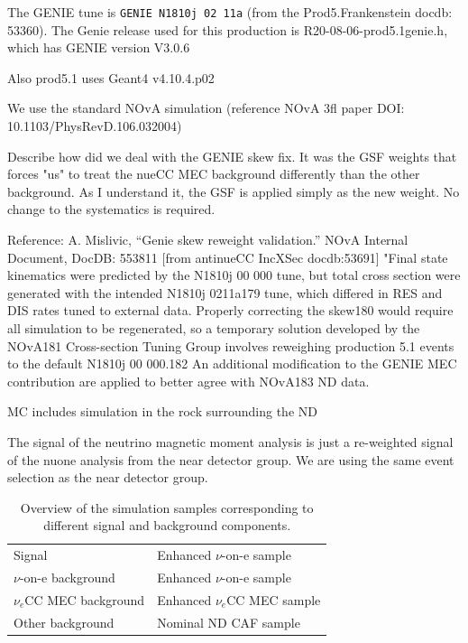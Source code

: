 The \textsf{GENIE} tune is \texttt{GENIE N1810j 02 11a} (from the Prod5.Frankenstein docdb: 53360).
The Genie release used for this production is R20-08-06-prod5.1genie.h, which has GENIE version V3.0.6 \cite{GENIE}

Also prod5.1 uses Geant4 v4.10.4.p02 \cite{Geant4}

We use the standard NOvA simulation (reference NOvA 3fl paper DOI: 10.1103/PhysRevD.106.032004)

Describe how did we deal with the GENIE skew fix. It was the GSF weights that forces "us" to treat the nueCC MEC background differently than the other background. As I understand it, the GSF is applied simply as the new weight. No change to the systematics is required.

Reference: A. Mislivic, “Genie skew reweight validation.” NOvA Internal Document, DocDB: 553811
[from antinueCC IncXSec docdb:53691]
"Final state kinematics were predicted by the N1810j 00 000 tune, but total cross section were generated with the intended N1810j 0211a179 tune, which differed in RES and DIS rates tuned to external data. Properly correcting the skew180 would require all simulation to be regenerated, so a temporary solution developed by the NOvA181 Cross-section Tuning Group involves reweighing production 5.1 events to the default N1810j 00 000.182 An additional modification to the GENIE MEC contribution are applied to better agree with NOvA183 ND data.

MC includes simulation in the rock surrounding the ND


The signal of the neutrino magnetic moment analysis is just a re-weighted signal of the \gls{nuone} analysis from the near detector group. We are using the same event selection as the near detector group.


\begin{table}[!ht]
\centering
\caption{Overview of the simulation samples corresponding to different signal and background components.}
\def\arraystretch{1.4}
\begin{tabular}{l@{\hskip 1in}l}
Signal                   & Enhanced $\nu$-on-e sample\\
$\nu$-on-e background    & Enhanced $\nu$-on-e sample\\
$\nu_e$CC MEC background & Enhanced $\nu_e$CC MEC sample\\
Other background         & Nominal ND CAF sample
\end{tabular}
\label{tab:DefinitionsOverview}
\end{table}

